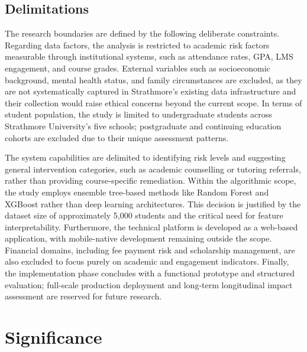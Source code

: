 \documentclass[12pt]{report}
\begin{document}
\subsection{Delimitations}
The research boundaries are defined by the following deliberate constraints. Regarding data factors, the analysis is restricted to academic risk factors measurable through institutional systems, such as attendance rates, GPA, LMS engagement, and course grades. External variables such as socioeconomic background, mental health status, and family circumstances are excluded, as they are not systematically captured in Strathmore's existing data infrastructure and their collection would raise ethical concerns beyond the current scope. In terms of student population, the study is limited to undergraduate students across Strathmore University's five schools; postgraduate and continuing education cohorts are excluded due to their unique assessment patterns.

The system capabilities are delimited to identifying risk levels and suggesting general intervention categories, such as academic counselling or tutoring referrals, rather than providing course-specific remediation. Within the algorithmic scope, the study employs ensemble tree-based methods like Random Forest and XGBoost \parencite{chen2016} rather than deep learning architectures. This decision is justified by the dataset size of approximately 5,000 students and the critical need for feature interpretability. Furthermore, the technical platform is developed as a web-based application, with mobile-native development remaining outside the scope. Financial domains, including fee payment risk and scholarship management, are also excluded to focus purely on academic and engagement indicators. Finally, the implementation phase concludes with a functional prototype and structured evaluation; full-scale production deployment and long-term longitudinal impact assessment are reserved for future research.

\section{Significance}
\end{document}
